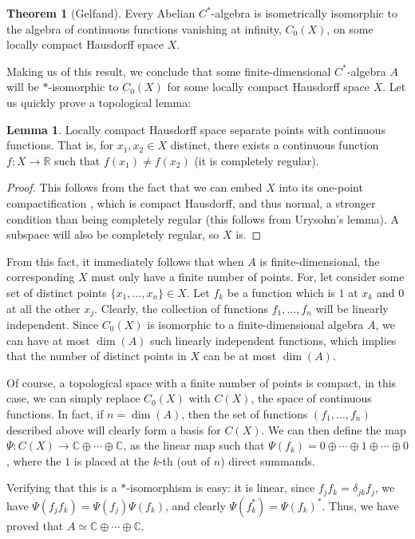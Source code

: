 \documentclass[aps,pra,showpacs,notitlepage,onecolumn,superscriptaddress,nofootinbib]{revtex4-1}
\theoremstyle{definition}
\newtheorem{lemma}{Lemma}[section]
\newtheorem{theorem}{Theorem}[section]
\begin{document}
\begin{theorem}[Gelfand]
  Every Abelian $C^{*}$-algebra is isometrically isomorphic to the algebra of continuous functions vanishing at infinity, $C_0(X)$, on some locally compact Hausdorff space $X$.
\end{theorem}

\noindent Making us of this result, we conclude that some finite-dimensional $C^{*}$-algebra $A$ will be $*$-isomorphic to $C_0(X)$ for some locally compact Hausdorff space $X$.
Let us quickly prove a topological lemma:

\begin{lemma}
  \label{lem:exist}
  Locally compact Hausdorff space separate points with continuous functions. That is, for $x_1, x_2 \in X$ distinct, there exists
  a continuous function $f : X \rightarrow \mathbb{R}$ such that $f(x_1) \neq f(x_2)$ (it is completely regular).
\end{lemma}
\begin{proof}
  This follows from the fact that we can embed $X$ into its one-point compactification , which is compact Hausdorff, and thus normal, a stronger
  condition than being completely regular (this follows from Urysohn's lemma). A subspace will also be completely regular, so $X$ is.
\end{proof}
\noindent From this fact, it immediately follows that when $A$ is finite-dimensional, the corresponding $X$ must only have a finite number of points.
For, let consider some set of distinct points $\{x_1, \dots, x_n\} \in X$. Let $f_k$ be a function which is $1$ at $x_k$ and $0$ at all the other $x_j$. Clearly,
the collection of functions $f_1, \dots, f_n$ will be linearly independent. Since $C_0(X)$ is isomorphic to a finite-dimensional algebra $A$, we can have
at most $\dim(A)$ such linearly independent functions, which implies that the number of distinct points in $X$ can be at most $\dim(A)$.

Of course, a topological space with a finite number of points is compact, in this case, we can simply replace $C_0(X)$ with $C(X)$, the space of continuous functions.
In fact, if $n = \dim(A)$, then the set of functions $(f_1, \dots, f_n)$ described above will clearly form a basis for $C(X)$. We can then define the map $\Psi : C(X) \rightarrow \mathbb{C} \oplus \cdots \oplus \mathbb{C}$,
as the linear map such that $\Psi(f_k) = 0 \oplus \cdots \oplus 1 \oplus \cdots \oplus 0$, where the $1$ is placed at the $k$-th (out of $n$) direct summands.

Verifying that this is a $*$-isomorphism is easy: it is linear, since $f_j f_k = \delta_{jk} f_j$, we have $\Psi(f_j f_k) = \Psi(f_j) \Psi(f_k)$, and clearly $\Psi(f_k^{*}) = \Psi(f_k)^{*}$. Thus,
we have proved that $A \simeq \mathbb{C} \oplus \cdots \oplus \mathbb{C}$.
\end{document}
